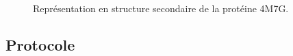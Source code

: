 
\begin{figure}[H]
   \centering
   \caption{Représentation en structure secondaire de la protéine 4M7G.}
   \label{fig:struct_secondaires}
\end{figure}


\subsection{Protocole}

